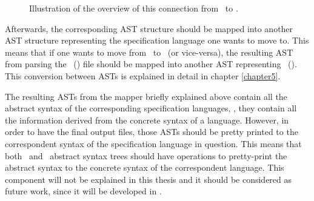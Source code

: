 \begin{figure}[!htb]
\begin{center}
\end{center}
\caption{Illustration of the overview of this connection from \vpp\ to \jml.}
\label{chap4:figure:vdmjml}
\end{figure}


Afterwards, the corresponding AST structure should be mapped into another AST structure representing the specification language one wants to move to. This means that if one wants to move from \vpp\ to \jml\ (or vice-versa), the resulting AST from parsing the \vpp\ (\jml) file should be mapped into another AST representing \jml\ (\vpp). This conversion between ASTs is explained in detail in chapter \ref{chapter5}.

The resulting ASTs from the mapper briefly explained above contain all the abstract syntax of the corresponding specification languages, \ie, they contain all the information derived from the concrete syntax of a language. However, in order to have the final output files, those ASTs should be pretty printed to the correspondent syntax of the specification language in question. This means that both \jml\ and \vpp\ abstract syntax trees should have operations to pretty-print the abstract syntax to the concrete syntax of the correspondent language. This component will not be explained in this thesis and it should be considered as future work, since it will be developed in \java.

